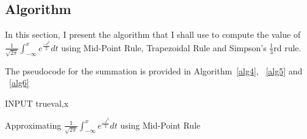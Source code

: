 \documentclass[titlepage, 11pt]{article}
\begin{document}
\subsection{Algorithm}
In this section, I present the algorithm that I shall use to compute the value of $\frac{1}{\sqrt{2\pi}} \int_{-\infty}^{x} e^{\frac{-t^2}{2}} dt$ using Mid-Point Rule, Trapezoidal Rule and Simpson's $\frac{1}{3}$rd rule. 

The pseudocode for the summation is provided in Algorithm~\ref{alg4}, ~\ref{alg5} and ~\ref{alg6}
\begin{center}
\begin{algorithm}[H]\label{alg4}

\SetAlgoLined

INPUT trueval,x \\

 \caption{Approximating  $\frac{1}{\sqrt{2\pi}} \int_{-\infty}^{x} e^{\frac{-t^2}{2}} dt$ using Mid-Point Rule}
\end{algorithm}    
\end{center}
\end{document}

